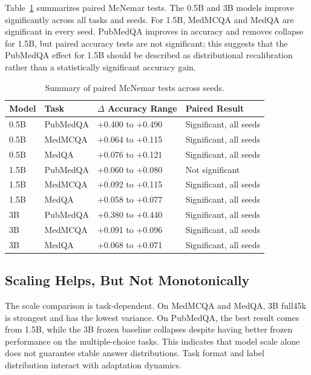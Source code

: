 \documentclass[11pt]{article}
\begin{document}
Table~\ref{tab:paired_summary} summarizes paired McNemar tests. The 0.5B and 3B models improve significantly across all tasks and seeds. For 1.5B, MedMCQA and MedQA are significant in every seed. PubMedQA improves in accuracy and removes collapse for 1.5B, but paired accuracy tests are not significant; this suggests that the PubMedQA effect for 1.5B should be described as distributional recalibration rather than a statistically significant accuracy gain.

\begin{table}[t]
\centering
\small
\caption{Summary of paired McNemar tests across seeds.}
\label{tab:paired_summary}
\begin{tabular}{llll}
\toprule
Model & Task & $\Delta$ Accuracy Range & Paired Result \\
\midrule
0.5B & PubMedQA & +0.400 to +0.490 & Significant, all seeds \\
0.5B & MedMCQA & +0.064 to +0.115 & Significant, all seeds \\
0.5B & MedQA & +0.076 to +0.121 & Significant, all seeds \\
1.5B & PubMedQA & +0.060 to +0.080 & Not significant \\
1.5B & MedMCQA & +0.092 to +0.115 & Significant, all seeds \\
1.5B & MedQA & +0.058 to +0.077 & Significant, all seeds \\
3B & PubMedQA & +0.380 to +0.440 & Significant, all seeds \\
3B & MedMCQA & +0.091 to +0.096 & Significant, all seeds \\
3B & MedQA & +0.068 to +0.071 & Significant, all seeds \\
\bottomrule
\end{tabular}
\end{table}

\subsection{Scaling Helps, But Not Monotonically}

The scale comparison is task-dependent. On MedMCQA and MedQA, 3B full45k is strongest and has the lowest variance. On PubMedQA, the best result comes from 1.5B, while the 3B frozen baseline collapses despite having better frozen performance on the multiple-choice tasks. This indicates that model scale alone does not guarantee stable answer distributions. Task format and label distribution interact with adaptation dynamics.
\end{document}
